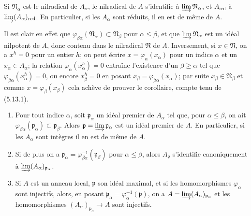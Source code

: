 \begin{corollary}[5.13.2]
\label{IV.2.s5.13.2-fr}
Si $\mathfrak N_\alpha$ est le nilradical de $A_\alpha$, le nilradical de $A$
s'identifie à $\varinjlim\mathfrak N_\alpha$, et $A_{\mathrm{red}}$ à
$\varinjlim(A_\alpha)_{\mathrm{red}}$. En particulier, si les $A_\alpha$ sont
réduits, il en est de même de $A$.
\end{corollary}


Il est clair en effet que
$\varphi_{\beta\alpha}(\mathfrak N_\alpha)\subset\mathfrak N_\beta$ pour
$\alpha\leq\beta$, et que $\varinjlim\mathfrak N_\alpha$ est un idéal
nilpotent de $A$, donc contenu dans le nilradical $\mathfrak N$ de $A$.
Inversement, si $x\in\mathfrak N$, on a $x^h=0$ pour un entier $h$; on peut
écrire $x=\varphi_\alpha(x_\alpha)$ pour un indice $\alpha$ et un
$x_\alpha\in A_\alpha$; la relation $\varphi_\alpha(x_\alpha^h)=0$ entraîne
l'existence d'un $\beta\geq\alpha$ tel que
$\varphi_{\beta\alpha}(x_\alpha^h)=0$, ou encore $x_\beta^h=0$ en posant
$x_\beta=\varphi_{\beta\alpha}(x_\alpha)$; par suite
$x_\beta\in\mathfrak N_\beta$ et comme $x=\varphi_\beta(x_\beta)$ cela achève
de prouver le corollaire, compte tenu de (5.13.1).

\begin{proposition}[5.13.3]
\label{IV.2.s5.13.3-fr}
\begin{enumerate}
\item[(i)] Pour tout indice $\alpha$, soit $\mathfrak p_\alpha$ un idéal
premier de $A_\alpha$ tel que, pour $\alpha\leq\beta$, on ait
$\varphi_{\beta\alpha}(\mathfrak p_\alpha)\subset\mathfrak p_\beta$. Alors
$\mathfrak p=\varinjlim\mathfrak p_\alpha$ est un idéal premier de $A$. En
particulier, si les $A_\alpha$ sont intègres il en est de même de $A$.
\item[(ii)] Si de plus on a
$\mathfrak p_\alpha=\varphi_{\beta\alpha}^{-1}(\mathfrak p_\beta)$ pour
$\alpha\leq\beta$, alors $A_{\mathfrak p}$ s'identifie canoniquement à
$\varinjlim(A_\alpha)_{\mathfrak p_\alpha}$.
\item[(iii)] Si $A$ est un anneau local, $\mathfrak p$ son idéal maximal, et
si les homomorphismes $\varphi_\alpha$ sont injectifs, alors, en posant
$\mathfrak p_\alpha=\varphi_\alpha^{-1}(\mathfrak p)$, on a
$A=\varinjlim(A_\alpha)_{\mathfrak p_\alpha}$ et les homomorphismes
$(A_\alpha)_{\mathfrak p_\alpha}\to A$ sont injectifs.
\end{enumerate}
\end{proposition}

